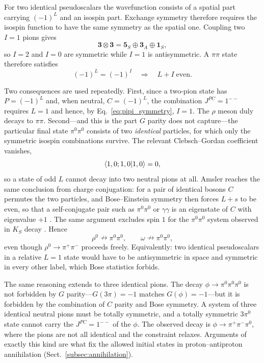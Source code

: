 For two identical pseudoscalars the wavefunction consists of a spatial part carrying
$(-1)^{L}$ and an isospin part. Exchange symmetry therefore requires the isospin
function to have the same symmetry as the spatial one. Coupling two $I=1$ pions gives
\begin{equation}
    \mathbf{3}\otimes\mathbf{3} = \mathbf{5}_S \oplus \mathbf{3}_A \oplus \mathbf{1}_S ,
    \label{eq:pipi_isospin}
\end{equation}
so $I = 2$ and $I = 0$ are symmetric while $I = 1$ is antisymmetric. A $\pi\pi$ state
therefore satisfies
\begin{equation}
    (-1)^{L} = (-1)^{I} \quad\Longrightarrow\quad L + I \;\text{even}.
    \label{eq:pipi_symmetry}
\end{equation}

Two consequences are used repeatedly. First, since a two-pion state has
$P = (-1)^{L}$ and, when neutral, $C = (-1)^{L}$, the combination $J^{PC} = 1^{--}$
requires $L = 1$ and hence, by Eq.~\eqref{eq:pipi_symmetry}, $I = 1$. The $\rho$ meson
duly decays to $\pi\pi$. Second---and this is the part $G$ parity does not capture---the
particular final state $\pi^0\pi^0$ consists of two \emph{identical} particles, for which
only the symmetric isospin combinations survive. The relevant Clebsch--Gordan coefficient
vanishes,
\begin{equation}
    \braket{1,0;1,0}{1,0} = 0 ,
    \label{eq:pi0pi0_CG}
\end{equation}
so a state of odd $L$ cannot decay into two neutral pions at all. Amsler reaches the
same conclusion from charge conjugation: for a pair of identical bosons $C$ permutes the
two particles, and Bose--Einstein symmetry then forces $L + s$ to be even, so that a
self-conjugate pair such as $\pi^0\pi^0$ or $\gamma\gamma$ is an eigenstate of $C$ with
eigenvalue $+1$ \cite[Ch.~3]{Amsler2018}. The same argument excludes spin $1$ for the
$\pi^0\pi^0$ system observed in $K_S$ decay \cite[Ch.~2]{Amsler2018}. Hence
\begin{equation*}
    \rho^0 \nrightarrow \pi^0\pi^0,
    \qquad
    \omega \nrightarrow \pi^0\pi^0 ,
\end{equation*}
even though $\rho^0 \to \pi^+\pi^-$ proceeds freely. Equivalently: two identical
pseudoscalars in a relative $L=1$ state would have to be antisymmetric in space and
symmetric in every other label, which Bose statistics forbids.

The same reasoning extends to three identical pions. The decay $\phi \to \pi^0\pi^0\pi^0$
is not forbidden by $G$ parity---$G(3\pi) = -1$ matches $G(\phi) = -1$---but it is
forbidden by the combination of $C$ parity and Bose symmetry. A system of three identical
neutral pions must be totally symmetric, and a totally symmetric $3\pi^0$ state cannot
carry the $J^{PC} = 1^{--}$ of the $\phi$. The observed decay is
$\phi \to \pi^+\pi^-\pi^0$, where the pions are not all identical and the constraint
relaxes. Arguments of exactly this kind are what fix the allowed initial states in
proton--antiproton annihilation (Sect.~\ref{subsec:annihilation}).

